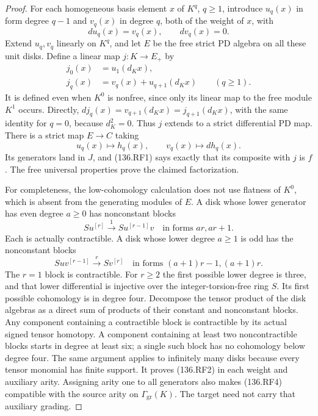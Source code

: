 \begin{proof}
For each homogeneous basis element \(x\) of \(K^q\),
\(q\geq1\), introduce \(u_q(x)\) in form degree
\(q-1\) and \(v_q(x)\) in degree \(q\), both of
the weight of \(x\), with
\[
                     d u_q(x)=v_q(x),\qquad d v_q(x)=0.
                                                               \tag{136.RF3}
\]
Extend \(u_q,v_q\) linearly on \(K^q\), and let
\(E\) be the free strict PD algebra on all these unit
disks.  Define a linear map \(j:K\to E_+\) by
\[
 \begin{aligned}
 j_0(x)&=u_1(d_Kx),\\
 j_q(x)&=v_q(x)+u_{q+1}(d_Kx)\qquad(q\geq1).
 \end{aligned}                                                \tag{136.RF4}
\]
It is defined even when \(K^0\) is nonfree, since only
its linear map to the free module \(K^1\) occurs.
Directly,
\(d j_q(x)=v_{q+1}(d_Kx)=j_{q+1}(d_Kx)\), with
the same identity for \(q=0\), because \(d_K^2=0\).
Thus \(j\) extends to a strict differential PD map.
There is a strict map \(E\to C\) taking
\[
                   u_q(x)\longmapsto h_q(x),\qquad
                   v_q(x)\longmapsto d h_q(x).
                                                               \tag{136.RF5}
\]
Its generators land in \(J\), and (136.RF1) says
exactly that its composite with \(j\) is \(f\).
The free universal properties prove the claimed factorization.

For completeness, the low-cohomology calculation does not use
flatness of \(K^0\), which is absent from the generating
modules of \(E\).  A disk whose lower generator has even
degree \(a\geq0\) has nonconstant blocks
\[
 S u^{[r]}\xrightarrow{1}S u^{[r-1]}v
                    \quad\text{in forms }ar,ar+1.
\]
Each is actually contractible.  A disk whose lower degree
\(a\geq1\) is odd has the nonconstant blocks
\[
 S u v^{[r-1]}\xrightarrow{r}S v^{[r]}
       \quad\text{in forms }(a+1)r-1,(a+1)r.
                                                               \tag{136.RF6}
\]
The \(r=1\) block is contractible.  For \(r\geq2\)
the first possible lower degree is three, and that lower
differential is injective over the integer-torsion-free ring
\(S\).  Its first possible cohomology is in degree four.
Decompose the tensor product of the disk algebras as a direct
sum of products of their constant and nonconstant blocks.
Any component containing a contractible block is contractible
by its actual signed tensor homotopy.  A component containing
at least two noncontractible blocks starts in degree at least
six; a single such block has no cohomology below degree four.
The same argument applies to infinitely many disks because
every tensor monomial has finite support.  It proves (136.RF2)
in each weight and auxiliary arity.  Assigning arity one to
all generators also makes (136.RF4) compatible with the source
arity on \(\Gamma_{\mathrm{gr}}(K)\).  The target need not
carry that auxiliary grading.


\end{proof}
